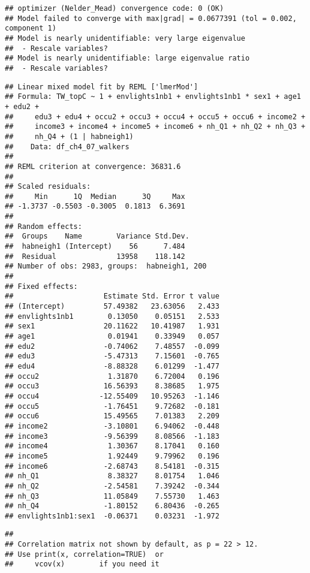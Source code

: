 \documentclass[
]{book}
\begin{document}
\begin{verbatim}
## optimizer (Nelder_Mead) convergence code: 0 (OK)
## Model failed to converge with max|grad| = 0.0677391 (tol = 0.002, component 1)
## Model is nearly unidentifiable: very large eigenvalue
##  - Rescale variables?
## Model is nearly unidentifiable: large eigenvalue ratio
##  - Rescale variables?
\end{verbatim}

\begin{verbatim}
## Linear mixed model fit by REML ['lmerMod']
## Formula: TW_topC ~ 1 + envlights1nb1 + envlights1nb1 * sex1 + age1 + edu2 +  
##     edu3 + edu4 + occu2 + occu3 + occu4 + occu5 + occu6 + income2 +  
##     income3 + income4 + income5 + income6 + nh_Q1 + nh_Q2 + nh_Q3 +  
##     nh_Q4 + (1 | habneigh1)
##    Data: df_ch4_07_walkers
## 
## REML criterion at convergence: 36831.6
## 
## Scaled residuals: 
##     Min      1Q  Median      3Q     Max 
## -1.3737 -0.5503 -0.3005  0.1813  6.3691 
## 
## Random effects:
##  Groups    Name        Variance Std.Dev.
##  habneigh1 (Intercept)    56      7.484 
##  Residual              13958    118.142 
## Number of obs: 2983, groups:  habneigh1, 200
## 
## Fixed effects:
##                     Estimate Std. Error t value
## (Intercept)         57.49382   23.63056   2.433
## envlights1nb1        0.13050    0.05151   2.533
## sex1                20.11622   10.41987   1.931
## age1                 0.01941    0.33949   0.057
## edu2                -0.74062    7.48557  -0.099
## edu3                -5.47313    7.15601  -0.765
## edu4                -8.88328    6.01299  -1.477
## occu2                1.31870    6.72004   0.196
## occu3               16.56393    8.38685   1.975
## occu4              -12.55409   10.95263  -1.146
## occu5               -1.76451    9.72682  -0.181
## occu6               15.49565    7.01383   2.209
## income2             -3.10801    6.94062  -0.448
## income3             -9.56399    8.08566  -1.183
## income4              1.30367    8.17041   0.160
## income5              1.92449    9.79962   0.196
## income6             -2.68743    8.54181  -0.315
## nh_Q1                8.38327    8.01754   1.046
## nh_Q2               -2.54581    7.39242  -0.344
## nh_Q3               11.05849    7.55730   1.463
## nh_Q4               -1.80152    6.80436  -0.265
## envlights1nb1:sex1  -0.06371    0.03231  -1.972
\end{verbatim}

\begin{verbatim}
## 
## Correlation matrix not shown by default, as p = 22 > 12.
## Use print(x, correlation=TRUE)  or
##     vcov(x)        if you need it
\end{verbatim}
\end{document}
